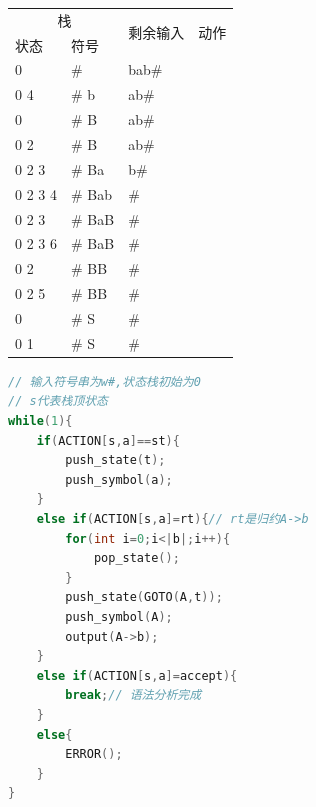 \documentclass[UTF8]{ctexart} %
\begin{document}
\begin{table}[H]
    \centering
    \begin{tabular}{|p{2cm}<{\centering}|p{2cm}<{\centering}|p{2.4cm}<{\centering}|p{3.4cm}<{\centering}|}
        \hline
        \multicolumn{2}{|c|}{栈} & \multirow{2}{*}{剩余输入} & \multirow{2}{*}{动作}   \\
        \cline{1-2}
        状态                      & 符号                    &                     & \\
        0                       & \#                    & bab\#               & \\
        0 4                     & \# b                  & ab\#                & \\
        0                       & \# B                  & ab\#                & \\
        0 2                     & \# B                  & ab\#                & \\
        0 2 3                   & \# Ba                 & b\#                 & \\
        0 2 3 4                 & \# Bab                & \#                  & \\
        0 2 3                   & \# BaB                & \#                  & \\
        0 2 3 6                 & \# BaB                & \#                  & \\
        0 2                     & \# BB                 & \#                  & \\
        0 2 5                   & \# BB                 & \#                  & \\
        0                       & \# S                  & \#                  & \\
        0 1                     & \# S                  & \#                  & \\
        \hline
    \end{tabular}
\end{table}

\begin{lstlisting}[language=c,style=c]
// 输入符号串为w#,状态栈初始为0
// s代表栈顶状态
while(1){
    if(ACTION[s,a]==st){
        push_state(t);
        push_symbol(a);
    }
    else if(ACTION[s,a]=rt){// rt是归约A->b
        for(int i=0;i<|b|;i++){
            pop_state();
        }
        push_state(GOTO(A,t));
        push_symbol(A);
        output(A->b);
    }
    else if(ACTION[s,a]=accept){
        break;// 语法分析完成
    }
    else{
        ERROR();
    }
}
\end{lstlisting}
\end{document}
